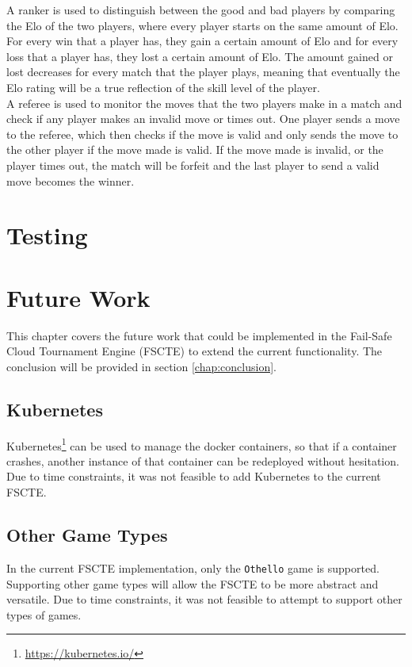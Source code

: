 \documentclass[a4paper, 12pt]{report}
\begin{document}
A ranker is used to distinguish between the good and bad players by comparing
the Elo of the two players, where every player starts on the same amount of Elo.
For every win that a player has, they gain a certain amount of Elo and for every
loss that a player has, they lost a certain amount of Elo. The amount gained or
lost decreases for every match that the player plays, meaning that eventually
the Elo rating will be a true reflection of the skill level of the player. \\

A referee is used to monitor the moves that the two players make in a match and
check if any player makes an invalid move or times out. One player sends a
move to the referee, which then checks if the move is valid and only sends
the move to the other player if the move made is valid. If the move made is
invalid, or the player times out, the match will be forfeit and the last player
to send a valid move becomes the winner.

\chapter{Testing}
\label{chap:testing}

\chapter{Future Work}
\label{chap:future}

This chapter covers the future work that could be implemented in the Fail-Safe
Cloud Tournament Engine (FSCTE) to extend the current functionality. The
conclusion will be provided in section \ref{chap:conclusion}.

\section{Kubernetes}

Kubernetes\footnote{\url{https://kubernetes.io/}} can be used to manage the docker
containers, so that if a container crashes, another instance of that container
can be redeployed without hesitation. Due to time constraints, it was not feasible
to add Kubernetes to the current FSCTE.

\section{Other Game Types}

In the current FSCTE implementation, only the \texttt{Othello} game is supported.
Supporting other game types will allow the FSCTE to be more abstract and versatile.
Due to time constraints, it was not feasible to attempt to support other types
of games.
\end{document}
